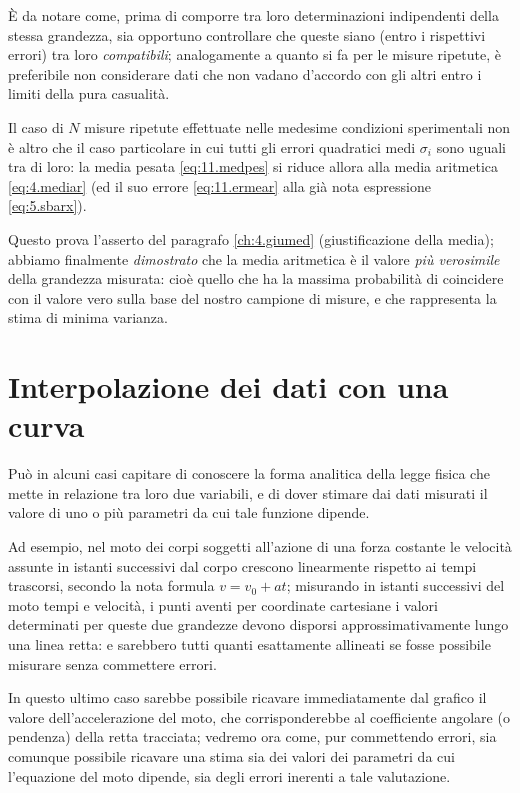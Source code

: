 %
\`E da notare come, prima di comporre tra loro
determinazioni indipendenti della stessa grandezza, sia
opportuno controllare che queste siano (entro i rispettivi
errori) tra loro \emph{compatibili}; analogamente a quanto
si fa per le misure ripetute, \`e preferibile non
considerare dati che non vadano d'accordo con gli altri
entro i limiti della pura casualit\`a.%

%
Il caso di $N$ misure ripetute effettuate nelle medesime
condizioni sperimentali non \`e altro che il caso
particolare in cui tutti gli errori quadratici medi
$\sigma_i$ sono uguali tra di loro: la media pesata
\eqref{eq:11.medpes} si riduce allora alla media aritmetica
\eqref{eq:4.mediar} (ed il suo errore \eqref{eq:11.ermear}
alla gi\`a nota espressione \eqref{eq:5.sbarx}).

Questo prova l'asserto del paragrafo \ref{ch:4.giumed}
(giustificazione della media); abbiamo finalmente
\emph{dimostrato} che la media aritmetica \`e il valore
\emph{pi\`u verosimile} della grandezza misurata: cio\`e
quello che ha la massima probabilit\`a di coincidere con il
valore vero sulla base del nostro campione di misure, e che
rappresenta la stima di minima varianza.%

\section{Interpolazione dei dati con una curva}
Pu\`o in alcuni casi capitare di conoscere la forma
analitica della legge fisica che mette in relazione tra loro
due variabili, e di dover stimare dai dati misurati il
valore di uno o pi\`u parametri da cui tale funzione
dipende.

Ad esempio, nel moto dei corpi soggetti all'azione di una
forza costante le velocit\`a assunte in istanti successivi
dal corpo crescono linearmente rispetto ai tempi trascorsi,
secondo la nota formula $ v = v_0 + a t $; misurando in
istanti successivi del moto tempi e velocit\`a, i punti
aventi per coordinate cartesiane i valori determinati per
queste due grandezze devono disporsi approssimativamente
lungo una linea retta: e sarebbero tutti quanti esattamente
allineati se fosse possibile misurare senza commettere
errori.

In questo ultimo caso sarebbe possibile ricavare
immediatamente dal grafico il valore dell'accelerazione del
moto, che corrisponderebbe al coefficiente angolare (o
pendenza) della retta tracciata; vedremo ora come, pur
commettendo errori, sia comunque possibile ricavare una
stima sia dei valori dei parametri da cui l'equazione del
moto dipende, sia degli errori inerenti a tale valutazione.

